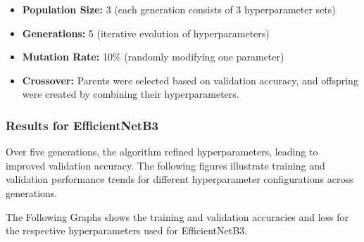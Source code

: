 \begin{itemize}
    \item \textbf{Population Size:} 3 (each generation consists of 3 hyperparameter sets)
    \item \textbf{Generations:} 5 (iterative evolution of hyperparameters)
    \item \textbf{Mutation Rate:} 10\% (randomly modifying one parameter)
    \item \textbf{Crossover:} Parents were selected based on validation accuracy, and offspring were created by combining their hyperparameters.
\end{itemize}

\subsubsection{Results for EfficientNetB3}
Over five generations, the algorithm refined hyperparameters, leading to improved validation accuracy. The following figures illustrate training and validation performance trends for different hyperparameter configurations across generations.

The Following Graphs shows the training and validation accuracies and loss for the respective hyperparameters used for EfficientNetB3.

